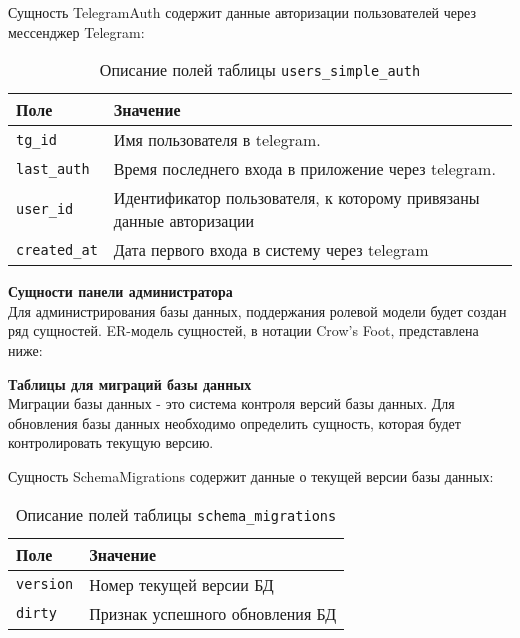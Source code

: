 Сущность TelegramAuth содержит данные авторизации пользователей через мессенджер Telegram:
\begin{table}[!ht]
    \caption{Описание полей таблицы \texttt{users\_simple\_auth}}
    \label{tbl:telegram_auth}
    \begin{center}
        \begin{tabular}{|p{}p{}|}
            \hline
            \textbf{Поле} & \textbf{Значение} \\\hline
            \texttt{tg\_id} & Имя пользователя в telegram. \\\hline
            \texttt{last\_auth} & Время последнего входа в приложение через telegram. \\\hline
            \texttt{user\_id} & Идентификатор пользователя, к которому привязаны данные авторизации \\\hline
            \texttt{created\_at} & Дата первого входа в систему через telegram \\\hline
        \end{tabular}
    \end{center}
\end{table}
\newpage

\noindent\textbf{Сущности панели администратора}\\
Для администрирования базы данных, поддержания ролевой модели будет создан ряд сущностей.
ER-модель сущностей, в нотации Crow’s Foot, представлена ниже:


\noindent\textbf{Таблицы для миграций базы данных}\\
Миграции базы данных - это система контроля версий базы данных.
Для обновления базы данных необходимо определить сущность, которая будет контролировать текущую версию.

Сущность SchemaMigrations содержит данные о текущей версии базы данных:
\begin{table}[!ht]
    \caption{Описание полей таблицы \texttt{schema\_migrations}}
    \label{tbl:schema_migrations}
    \begin{center}
        \begin{tabular}{|p{}p{}|}
            \hline
            \textbf{Поле} & \textbf{Значение} \\\hline
            \texttt{version} & Номер текущей версии БД \\\hline
            \texttt{dirty} & Признак успешного обновления БД \\\hline
        \end{tabular}
    \end{center}
\end{table}

